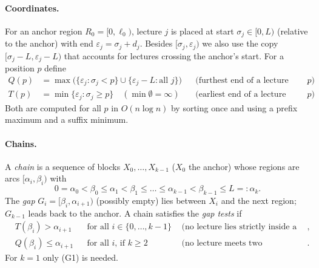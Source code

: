 \documentclass[11pt,a4paper]{article}
\theoremstyle{definition}
\theoremstyle{remark}
\newcommand{\Qf}{Q}
\newcommand{\Tf}{T}
\begin{document}
\paragraph{Coordinates.} For an anchor region $R_0=[0,\ell_0)$, lecture $j$ is placed at
start $\sigma_j\in[0,L)$ (relative to the anchor) with end $\varepsilon_j=\sigma_j+d_j$.
Besides $[\sigma_j,\varepsilon_j)$ we also use the copy $[\sigma_j-L,\varepsilon_j-L)$ that
accounts for lectures crossing the anchor's start.  For a position $p$ define
\begin{align*}
 \Qf(p)&=\max\bigl(\{\varepsilon_j:\sigma_j<p\}\cup\{\varepsilon_j-L:\text{all }j\}\bigr)
   &&\text{(furthest end of a lecture copy starting before $p$)},\\
 \Tf(p)&=\min\{\varepsilon_j:\sigma_j\ge p\}\quad(\min\emptyset=\infty)
   &&\text{(earliest end of a lecture starting at or after $p$)}.
\end{align*}
Both are computed for all $p$ in $O(n\log n)$ by sorting once and using a prefix
maximum and a suffix minimum.

\paragraph{Chains.} A \emph{chain} is a sequence of blocks $X_0,\dots,X_{k-1}$
($X_0$ the anchor) whose regions are arcs $[\alpha_i,\beta_i)$ with
\[
 0=\alpha_0<\beta_0\le\alpha_1<\beta_1\le\dots\le\alpha_{k-1}<\beta_{k-1}\le L=:\alpha_k .
\]
The \emph{gap} $G_i=[\beta_i,\alpha_{i+1})$ (possibly empty) lies between $X_i$ and the
next region; $G_{k-1}$ leads back to the anchor.  A chain satisfies the \emph{gap tests}
if
\begin{align}
 &\Tf(\beta_i)>\alpha_{i+1} &&\text{for all } i\in\{0,\dots,k-1\}
   &&\text{(no lecture lies strictly inside a gap)},\tag{G1}\\
 &\Qf(\beta_i)\le\alpha_{i+1} &&\text{for all } i\text{, if }k\ge2
   &&\text{(no lecture meets two consecutive regions)}.\tag{G2}
\end{align}
For $k=1$ only (G1) is needed.
\end{document}
